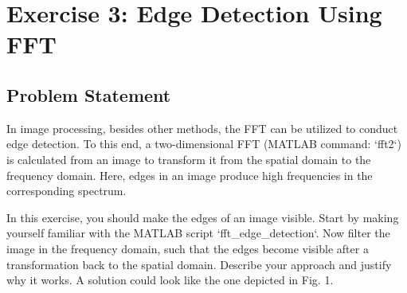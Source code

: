 \section*{Exercise 3: Edge Detection Using FFT}

\subsection*{Problem Statement}
In image processing, besides other methods, the FFT can be utilized to conduct edge detection. To this end, a two-dimensional FFT (MATLAB command: `fft2`) is calculated from an image to transform it from the spatial domain to the frequency domain. Here, edges in an image produce high frequencies in the corresponding spectrum.

In this exercise, you should make the edges of an image visible. Start by making yourself familiar with the MATLAB script `fft_edge_detection`. Now filter the image in the frequency domain, such that the edges become visible after a transformation back to the spatial domain. Describe your approach and justify why it works. A solution could look like the one depicted in Fig. 1.

